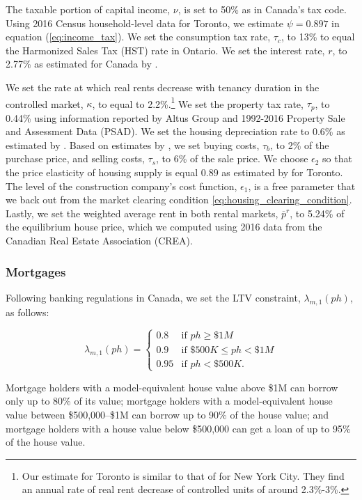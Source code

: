 \documentclass[parskip=full]{article}
\begin{document}
The taxable portion of capital income, $\nu$, is set to 50\% as in Canada's tax code. Using 2016 Census household-level data for Toronto, we estimate $\psi=0.897$ in equation (\ref{eq:income_tax}). We set the consumption tax rate, $\tau_{c}$, to 13\% to equal the Harmonized Sales Tax (HST) rate in Ontario. We set the interest rate, $r$, to 2.77\% as estimated for Canada by \citet{bruneau-etal-2018}. 

We set the rate at which real rents decrease with tenancy duration in the controlled market, $\kappa$, to equal to 2.2\%.\footnote{Our estimate for Toronto is similar to that of \citet{fmn-2022} for New York City. They find an annual rate of real rent decrease of controlled units of around 2.3\%-3\%.} We set the property tax rate, $\tau_p$, to 0.44\% using information reported by Altus Group and 1992-2016 Property Sale and Assessment Data (PSAD). We set the housing depreciation rate to 0.6\% as estimated by \citet{rosenthal-2014}. Based on estimates by \citet{gm-2003}, we set buying costs, $\tau_{b}$, to 2\% of the purchase price, and selling costs, $\tau_{s}$, to 6\% of the sale price. We choose $\epsilon_{2}$ so that the price elasticity of housing supply is equal $0.89$ as estimated by \citet{piaxao-2021} for Toronto. The level of the construction company's cost function, $\epsilon_1$, is a free parameter that we back out from the market clearing condition \eqref{eq:housing_clearing_condition}. Lastly, we set the weighted average rent in both rental markets, $\overline{p}^{r}$, to 5.24\% of the equilibrium house price, which we computed using 2016 data from the Canadian Real Estate Association (CREA).

\subsubsection{Mortgages}

Following banking regulations in Canada, we set the LTV constraint, $\lambda_{m,1}(ph)$, as follows:

\begin{equation*}
\lambda_{m,1}(ph) = \begin{cases}
0.8 &\text{if $ph\geq \$1M$}\\
0.9 &\text{if $\$500K\leq ph< \$1M$}\\
0.95 &\text{if $ph < \$500K$}.
\end{cases}
\end{equation*}

\noindent Mortgage holders with a model-equivalent house value above \$1M can borrow only up to 80\% of its value; mortgage holders with a model-equivalent house value between \$500,000--\$1M can borrow up to 90\% of the house value; and mortgage holders with a house value below \$500,000 can get a loan of up to 95\% of the house value. 
\end{document}

